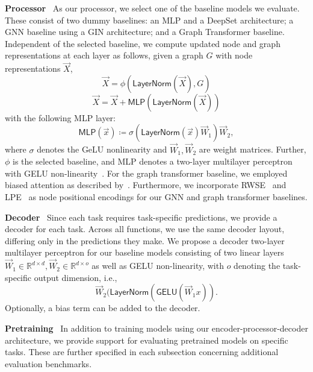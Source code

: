 \textbf{Processor}~
As our processor, we select one of the baseline models we evaluate. These consist of two dummy baselines: an MLP and a DeepSet architecture; a GNN baseline using a GIN architecture; and a Graph Transformer baseline. Independent of the selected baseline, we compute updated node and graph representations at each layer as follows, given a graph $G$ with node representations $\vec{X}$,
\begin{equation}\label{eq:ch06:processor_eq}
\vec{X} = \phi(\textsf{LayerNorm}(\vec{X}), G)
\end{equation}
\begin{equation*}
    \vec{X} = \vec{X} + \textsf{MLP}(\textsf{LayerNorm}(\vec{X}))
\end{equation*}
with the following MLP layer:
\begin{equation*}
    \textsf{MLP}(\vec{x}) \coloneqq \sigma(\textsf{LayerNorm}(\vec{x})\vec{W}_1)\vec{W}_2,
\end{equation*}
where $\sigma$ denotes the GeLU nonlinearity and $\vec{W}_1, \vec{W}_2$ are weight matrices.
Further, $\phi$ is the selected baseline, and \textsf{MLP} denotes a two-layer multilayer perceptron with GELU non-linearity~\citep{HenGim16}. For the graph transformer baseline, we employed biased attention as described by~\cite{BecEtAl25,StoEtAl25}. Furthermore, we incorporate RWSE~\citep{DwiEtAl22} and LPE~\citep{MulMor24} as node positional encodings for our GNN and graph transformer baselines. 

\textbf{Decoder}~
Since each task requires task-specific predictions, we provide a decoder for each task. Across all functions, we use the same decoder layout, differing only in the predictions they make. We propose a decoder two-layer multilayer perceptron for our baseline models consisting of two linear layers $\vec{W}_1 \in \mathbb{R}^{d \times d}, \vec{W}_2 \in \mathbb{R}^{d \times o}$ as well as GELU non-linearity, with $o$ denoting the task-specific output dimension, i.e.,
\begin{equation*}
\vec{W}_2(\textsf{LayerNorm}(\textsf{GELU}(\vec{W}_1 x)).
\end{equation*}
Optionally, a bias term can be added to the decoder. 

\textbf{Pretraining}~
In addition to training models using our encoder-processor-decoder architecture, we provide support for evaluating pretrained models on specific tasks. These are further specified in each subsection concerning additional evaluation benchmarks.

